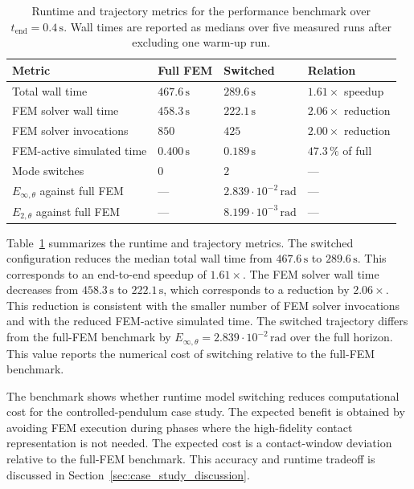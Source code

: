 \begin{table}[htbp]
    \centering
    \small
    \caption[Runtime and trajectory metrics for the performance benchmark]{Runtime and trajectory metrics for the performance benchmark over \(t_{\mathrm{end}}=0.4\,\mathrm{s}\).
    Wall times are reported as medians over five measured runs after excluding one warm-up run.}
    \label{tab:case_performance_metrics}
    \begin{tabular}{p{4.8cm} p{3.1cm} p{3.1cm} p{2.4cm}}
        \toprule
        \textbf{Metric} & \textbf{Full \ac{FEM}} & \textbf{Switched} & \textbf{Relation} \\
        \midrule
        Total wall time
          & \(467.6\,\mathrm{s}\)
          & \(289.6\,\mathrm{s}\)
          & \(1.61\times\) speedup \\
        \ac{FEM} solver wall time
          & \(458.3\,\mathrm{s}\)
          & \(222.1\,\mathrm{s}\)
          & \(2.06\times\) reduction \\
        \ac{FEM} solver invocations
          & \(850\)
          & \(425\)
          & \(2.00\times\) reduction \\
        \ac{FEM}-active simulated time
          & \(0.400\,\mathrm{s}\)
          & \(0.189\,\mathrm{s}\)
          & \(47.3\,\%\) of full \\
        Mode switches
          & \(0\)
          & \(2\)
          & --- \\
        \(E_{\infty,\theta}\) against full \ac{FEM}
          & ---
          & \(2.839\cdot 10^{-2}\,\mathrm{rad}\)
          & --- \\
        \(E_{2,\theta}\) against full \ac{FEM}
          & ---
          & \(8.199\cdot 10^{-3}\,\mathrm{rad}\)
          & --- \\
        \bottomrule
    \end{tabular}
\end{table}

Table~\ref{tab:case_performance_metrics} summarizes the runtime and trajectory metrics.
The switched configuration reduces the median total wall time from \(467.6\,\mathrm{s}\) to \(289.6\,\mathrm{s}\).
This corresponds to an end-to-end speedup of \(1.61\times\).
The \ac{FEM} solver wall time decreases from \(458.3\,\mathrm{s}\) to \(222.1\,\mathrm{s}\), which corresponds to a reduction by \(2.06\times\).
This reduction is consistent with the smaller number of \ac{FEM} solver invocations and with the reduced \ac{FEM}-active simulated time.
The switched trajectory differs from the full-\ac{FEM} benchmark by \(E_{\infty,\theta}=2.839\cdot 10^{-2}\,\mathrm{rad}\) over the full horizon.
This value reports the numerical cost of switching relative to the full-\ac{FEM} benchmark.

The benchmark shows whether runtime model switching reduces computational cost for the controlled-pendulum case study.
The expected benefit is obtained by avoiding \ac{FEM} execution during phases where the high-fidelity contact representation is not needed.
The expected cost is a contact-window deviation relative to the full-\ac{FEM} benchmark.
This accuracy and runtime tradeoff is discussed in Section~\ref{sec:case_study_discussion}.
